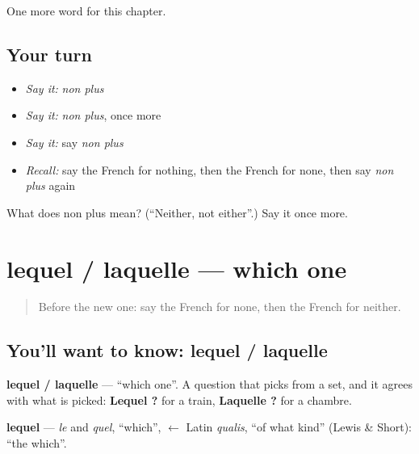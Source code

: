 \begin{grammarlens}[title={What you've built}]
One more word for this chapter.
\end{grammarlens}

\subsection*{Your turn}
\begin{itemize}
\raggedright
  \item \emph{Say it:} \emph{non plus}
  \item \emph{Say it:} \emph{non plus}, once more
  \item \emph{Say it:} say \emph{non plus}
  \item \emph{Recall:} say the French for nothing, then the French for none, then say \emph{non plus} again
\end{itemize}

\begin{tcolorbox}[breakable,colback=teal!4,colframe=teal!35!black,title={Before you move on}]
What does non plus mean? (\textquotedblleft{}Neither, not either\textquotedblright{}.) Say it once more.
\end{tcolorbox}
\section[lequel / laquelle]{lequel / laquelle — which one}

\label{lesson:FR-C139-lequel}



\begin{quote}
Before the new one: say the French for none, then the French for neither.
\end{quote}

\subsection*{You'll want to know: lequel / laquelle}
\textbf{lequel / laquelle} — \textquotedblleft{}which one\textquotedblright{}. A question that picks from a set, and it agrees with what is picked: \textbf{Lequel ?} for a train, \textbf{Laquelle ?} for a chambre.

\begin{cousinweb}
\textbf{lequel} — \emph{le} and \emph{quel}, \textquotedblleft{}which\textquotedblright{}, $\leftarrow$ Latin \emph{qualis}, \textquotedblleft{}of what kind\textquotedblright{} (Lewis \& Short): \textquotedblleft{}the which\textquotedblright{}.
\end{cousinweb}

